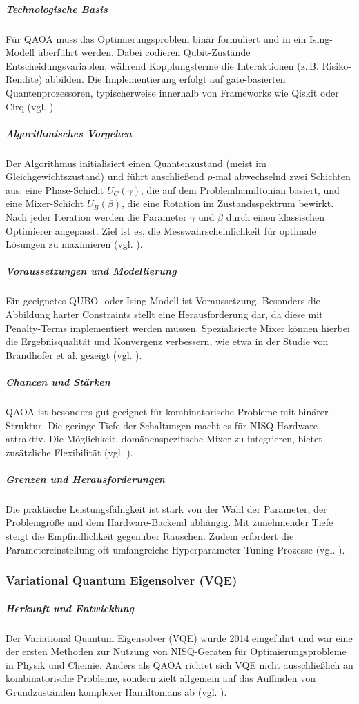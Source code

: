 \subparagraph{Technologische Basis}
Für QAOA muss das Optimierungsproblem binär formuliert und in ein Ising-Modell überführt werden. Dabei codieren Qubit-Zustände Entscheidungsvariablen, während Kopplungsterme die Interaktionen (z.\,B. Risiko-Rendite) abbilden. Die Implementierung erfolgt auf gate-basierten Quantenprozessoren, typischerweise innerhalb von Frameworks wie Qiskit oder Cirq (vgl. \cite{buonaiuto_best_2023}).

\subparagraph{Algorithmisches Vorgehen}
Der Algorithmus initialisiert einen Quantenzustand (meist im Gleichgewichtszustand) und führt anschließend $p$-mal abwechselnd zwei Schichten aus: eine Phase-Schicht $U_C(\gamma)$, die auf dem Problemhamiltonian basiert, und eine Mixer-Schicht $U_B(\beta)$, die eine Rotation im Zustandsspektrum bewirkt. Nach jeder Iteration werden die Parameter $\gamma$ und $\beta$ durch einen klassischen Optimierer angepasst. Ziel ist es, die Messwahrscheinlichkeit für optimale Lösungen zu maximieren (vgl. \cite{brandhofer_benchmarking_2022}).

\subparagraph{Voraussetzungen und Modellierung}
Ein geeignetes QUBO- oder Ising-Modell ist Voraussetzung. Besonders die Abbildung harter Constraints stellt eine Herausforderung dar, da diese mit Penalty-Terms implementiert werden müssen. Spezialisierte Mixer können hierbei die Ergebnisqualität und Konvergenz verbessern, wie etwa in der Studie von Brandhofer et al. gezeigt (vgl. \cite{brandhofer_benchmarking_2022}).

\subparagraph{Chancen und Stärken}
QAOA ist besonders gut geeignet für kombinatorische Probleme mit binärer Struktur. Die geringe Tiefe der Schaltungen macht es für NISQ-Hardware attraktiv. Die Möglichkeit, domänenspezifische Mixer zu integrieren, bietet zusätzliche Flexibilität (vgl. \cite{brandhofer_benchmarking_2022}).

\subparagraph{Grenzen und Herausforderungen}
Die praktische Leistungsfähigkeit ist stark von der Wahl der Parameter, der Problemgröße und dem Hardware-Backend abhängig. Mit zunehmender Tiefe steigt die Empfindlichkeit gegenüber Rauschen. Zudem erfordert die Parametereinstellung oft umfangreiche Hyperparameter-Tuning-Prozesse (vgl. \cite{buonaiuto_best_2023}).

\subsubsection{Variational Quantum Eigensolver (VQE)}

\subparagraph{Herkunft und Entwicklung}
Der Variational Quantum Eigensolver (VQE) wurde 2014 eingeführt und war eine der ersten Methoden zur Nutzung von NISQ-Geräten für Optimierungsprobleme in Physik und Chemie. Anders als QAOA richtet sich VQE nicht ausschließlich an kombinatorische Probleme, sondern zielt allgemein auf das Auffinden von Grundzuständen komplexer Hamiltonians ab (vgl. \cite{buonaiuto_best_2023}).

